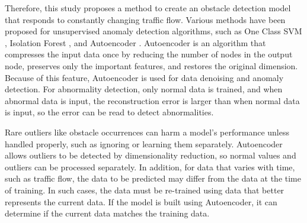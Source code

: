 \documentclass[paper]{ieice}
\begin{document}
Therefore, this study proposes a method to create an obstacle detection model that responds to constantly changing traffic flow.
%
Various methods have been proposed for unsupervised anomaly detection algorithms, such as One Class SVM \cite{chen2001one}, Isolation Forest \cite{isolationforest}, and Autoencoder \cite{bank2021autoencoders}.
%
Autoencoder is an algorithm that compresses the input data once by reducing the number of nodes in the output node, preserves only the important features, and restores the original dimension.
%
Because of this feature, Autoencoder is used for data denoising and anomaly detection.
%
For abnormality detection, only normal data is trained, and when abnormal data is input, the reconstruction error is larger than when normal data is input, so the error can be read to detect abnormalities.
%
\par
%
Rare outliers like obstacle occurrences can harm a model's performance unless handled properly, such as ignoring or learning them separately.
%
Autoencoder allows outliers to be detected by dimensionality reduction, so normal values and outliers can be processed separately.
%
In addition, for data that varies with time, such as traffic flow, the data to be predicted may differ from the data at the time of training.
%
In such cases, the data must be re-trained using data that better represents the current data.
%
If the model is built using Autoencoder, it can determine if the current data matches the training data.
\end{document}
